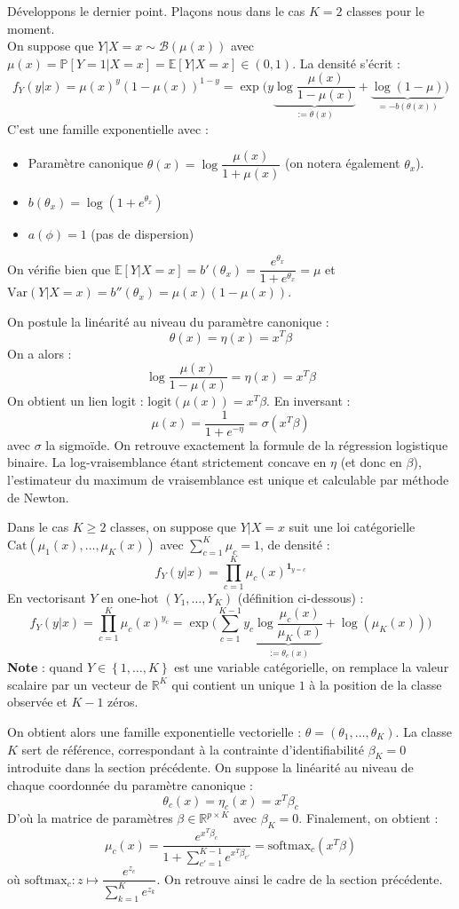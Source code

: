 \documentclass[a4paper,11pt]{paper}
\theoremstyle{plain}
\theoremstyle{definition}
\theoremstyle{remark}
\begin{document}
Développons le dernier point. Plaçons nous dans le cas $K = 2$ classes pour le moment. \\
On suppose que $Y  | X = x \sim \mathcal B(\mu(x))$ avec $\mu(x) = \mathbb P[Y = 1| X =x ] = \mathbb E[Y | X = x]\in (0,1)$. La densité s'écrit :
$$f_Y(y | x) =\mu(x)^y(1- \mu(x))^{1-y} = \exp\bigg(y\underbrace{\log \dfrac{\mu(x)}{1- \mu(x)}}_{:= \theta(x)} + \underbrace{\log (1- \mu)}_{= -b(\theta(x))} \bigg)$$
C'est une famille exponentielle avec :
\begin{itemize}
    \item Paramètre canonique $\theta(x) = \log \dfrac{\mu(x)}{1+ \mu(x)}$ (on notera également $\theta_x$).
    \item $b(\theta_x) = \log(1 + e^{\theta_x})$
    \item $a(\phi) = 1$ (pas de dispersion)
\end{itemize}
On vérifie bien que $\mathbb E[Y | X = x] = b'(\theta_x) = \dfrac{e^{\theta_x}}{1 + e^{\theta_x}} = \mu$ et $\text{Var}(Y | X =x)=b''(\theta_x)= \mu(x)(1- \mu(x))$.

On postule la linéarité au niveau du paramètre canonique :
$$\theta(x) = \eta(x) = x^T \beta$$
On a alors :
$$\log \dfrac{\mu(x)}{1- \mu(x)} = \eta(x) = x^T\beta$$
On obtient un lien logit : $\text{logit}(\mu(x)) = x^T\beta$. En inversant :
$$\mu(x) =  \dfrac{1}{1+e^{-\eta}} = \sigma(x^T \beta)$$
avec $\sigma$ la sigmoïde. On retrouve exactement la formule de la régression logistique binaire. La log-vraisemblance étant strictement concave en $\eta$ (et donc en $\beta$), l'estimateur du maximum de vraisemblance est unique et calculable par méthode de Newton.

Dans le cas $K \geqslant 2$ classes, on suppose que $Y | X =x $ suit une loi catégorielle $\text{Cat}(\mu_1(x), \dots, \mu_K(x))$ avec $\displaystyle \sum_{c=1}^K \mu_c = 1$, de densité :
$$f_Y(y | x) = \prod_{c=1}^K\mu_c(x)^{\mathbf 1_{y = c}}$$
En vectorisant $Y$ en one-hot $(Y_1, \dots, Y_K)$ (définition ci-dessous) :
$$f_Y(y | x)= \prod_{c=1}^K\mu_c(x)^{y_c} = \exp\bigg( \sum_{c=1}^{K-1} y_c \underbrace{\log \dfrac{\mu_c(x)}{\mu_K(x)}}_{:= \theta_c(x)} + \log(\mu_K(x))\bigg)$$
\textbf{Note} : quand $Y \in \left\{1, \dots, K\right\}$ est une variable catégorielle, on remplace la valeur scalaire par un vecteur de $\mathbb R^K$ qui contient un unique $1$ à la position de la classe observée et $K-1$ zéros.

On obtient alors une famille exponentielle vectorielle : $\theta = (\theta_1, \dots, \theta_K)$. La classe $K$ sert de référence, correspondant à la contrainte d'identifiabilité $\beta_K = 0$ introduite dans la section précédente.
On suppose la linéarité au niveau de chaque coordonnée du paramètre canonique :
$$\theta_c(x) = \eta_c(x) = x^T\beta_c$$
D'où la matrice de paramètres $\beta \in \mathbb R^{p \times K}$ avec $\beta_K = 0$. Finalement, on obtient :
$$\mu_c(x) = \dfrac{e^{x^T\beta_c}}{1 + \sum_{c'=1}^{K-1} e^{x^T \beta_{c'}}} = \text{softmax}_c(x^T\beta)$$
où $\text{softmax}_c :z \mapsto \dfrac{e^{z_c}}{\sum_{k=1}^Ke^{z_k}}$. On retrouve ainsi le cadre de la section précédente.
\end{document}
